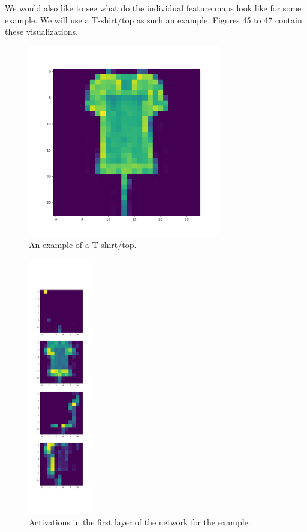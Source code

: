 \documentclass{article}
\begin{document}
We would also like to see what do the individual feature maps look like for
some example. We will use a T-shirt/top as such an example. Figures 45 to 47
contain these visualizations.

\begin{figure}
  \centering
  \includegraphics[width=0.75\textwidth]{../../out/activations_cnn/fmnist/t-sne/filter_outputs/class0_l0.png}
    \caption{An example of a T-shirt/top.}
\end{figure}

\begin{figure}
  \centering
  \includegraphics[width=0.25\textwidth]{../../out/activations_cnn/fmnist/t-sne/filter_outputs/class0_l1.png}
  \caption{Activations in the first layer of the network for the example.}
\end{figure}
\end{document}
